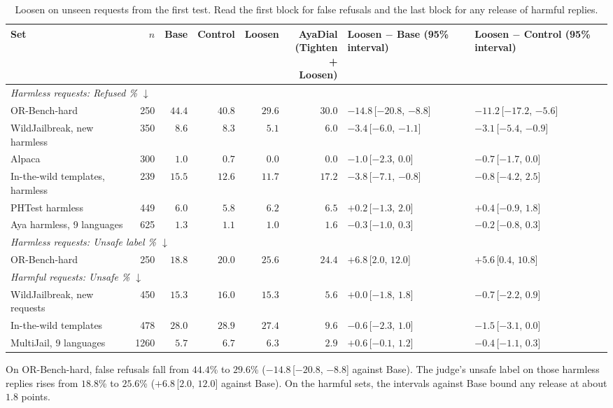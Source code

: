 \documentclass[10pt,a4paper]{article}
\renewcommand{\arraystretch}{1.12}
\begin{document}
\begin{table}[H]\centering\small\setlength{\tabcolsep}{3.0pt}\renewcommand{\arraystretch}{1.25}\begin{tabular}{|l|r|r|r|r|r|l|l|}\hline
Set & $n$ & Base & Control & Loosen & \makecell[r]{AyaDial\\(Tighten\\+ Loosen)} & \makecell[l]{Loosen $-$ Base\\(95\% interval)} & \makecell[l]{Loosen $-$ Control\\(95\% interval)}\\\hline
\multicolumn{8}{|l|}{\textit{Harmless requests: Refused \% $\downarrow$}}\\\hline
OR-Bench-hard & 250 & $44.4$ & $40.8$ & \cellcolor{win}$\mathbf{29.6}$ & $30.0$ & $-14.8$\,[$-20.8$, $-8.8$] & $-11.2$\,[$-17.2$, $-5.6$]\\\hline
WildJailbreak, new harmless & 350 & $8.6$ & $8.3$ & \cellcolor{win}$\mathbf{5.1}$ & $6.0$ & $-3.4$\,[$-6.0$, $-1.1$] & $-3.1$\,[$-5.4$, $-0.9$]\\\hline
Alpaca & 300 & $1.0$ & $0.7$ & $0.0$ & $0.0$ & $-1.0$\,[$-2.3$, $0.0$] & $-0.7$\,[$-1.7$, $0.0$]\\\hline
In-the-wild templates, harmless & 239 & $15.5$ & $12.6$ & $11.7$ & $17.2$ & $-3.8$\,[$-7.1$, $-0.8$] & $-0.8$\,[$-4.2$, $2.5$]\\\hline
PHTest harmless & 449 & $6.0$ & $5.8$ & $6.2$ & $6.5$ & $+0.2$\,[$-1.3$, $2.0$] & $+0.4$\,[$-0.9$, $1.8$]\\\hline
Aya harmless, 9 languages & 625 & $1.3$ & $1.1$ & $1.0$ & $1.6$ & $-0.3$\,[$-1.0$, $0.3$] & $-0.2$\,[$-0.8$, $0.3$]\\\hline
\multicolumn{8}{|l|}{\textit{Harmless requests: Unsafe label \% $\downarrow$}}\\\hline
OR-Bench-hard & 250 & $18.8$ & $\mathbf{20.0}$ & $25.6$ & $24.4$ & $+6.8$\,[$2.0$, $12.0$] & $+5.6$\,[$0.4$, $10.8$]\\\hline
\multicolumn{8}{|l|}{\textit{Harmful requests: Unsafe \% $\downarrow$}}\\\hline
WildJailbreak, new requests & 450 & $15.3$ & $16.0$ & $15.3$ & \cellcolor{win}$\mathbf{5.6}$ & $+0.0$\,[$-1.8$, $1.8$] & $-0.7$\,[$-2.2$, $0.9$]\\\hline
In-the-wild templates & 478 & $28.0$ & $28.9$ & $27.4$ & \cellcolor{win}$\mathbf{9.6}$ & $-0.6$\,[$-2.3$, $1.0$] & $-1.5$\,[$-3.1$, $0.0$]\\\hline
MultiJail, 9 languages & 1260 & $5.7$ & $6.7$ & $6.3$ & \cellcolor{win}$\mathbf{2.9}$ & $+0.6$\,[$-0.1$, $1.2$] & $-0.4$\,[$-1.1$, $0.3$]\\\hline
\end{tabular}\caption{Loosen on unseen requests from the first test. Read the first block for false refusals and the last block for any release of harmful replies.}\label{tab:loosen}\end{table}
On OR-Bench-hard, false refusals fall from $44.4$\% to $29.6$\% ($-14.8$\,[$-20.8$, $-8.8$] against Base). The judge's unsafe label on those harmless replies rises from $18.8$\% to $25.6$\% ($+6.8$\,[$2.0$, $12.0$] against Base). On the harmful sets, the intervals against Base bound any release at about $1.8$ points.
\end{document}
